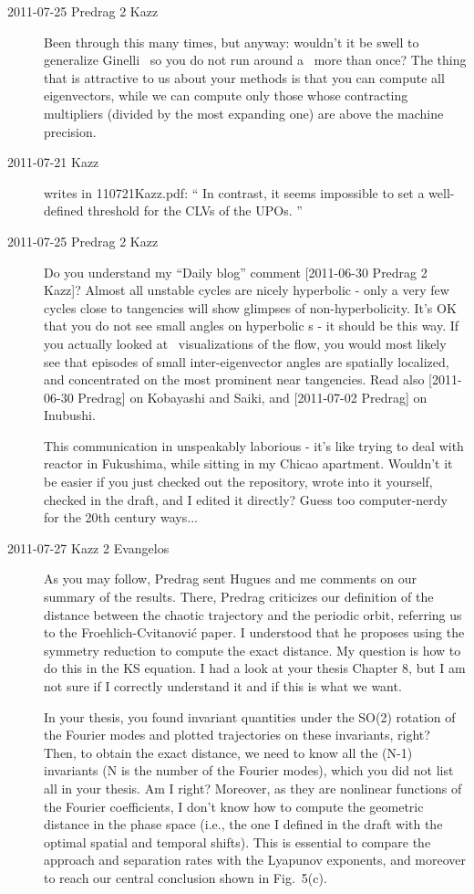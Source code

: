 \begin{description}
\item[2011-07-25 Predrag 2 Kazz]
Been through this many times, but anyway: wouldn't it be swell to
generalize Ginelli \etal\ so you do not run around a \po\ more than once?
The thing that is attractive to us about your methods is that you can
compute all eigenvectors, while we can compute only those whose
contracting multipliers (divided by the most expanding one) are above the
machine precision.

\item[2011-07-21 Kazz] writes in 110721Kazz.pdf:
``
In contrast, it seems impossible to set a well-defined threshold for the
CLVs of the UPOs.
''

\item[2011-07-25 Predrag 2 Kazz]
Do you understand my ``Daily blog'' comment  [2011-06-30 Predrag 2 Kazz]?
Almost all unstable cycles are nicely hyperbolic - only a very few cycles
close to tangencies will show glimpses of non-hyperbolicity. It's OK that
you do not see small angles on hyperbolic \po s - it should be this way.
If you actually looked at \statesp\ visualizations of the
flow, you would most likely see that
episodes of small inter-eigenvector angles are spatially localized, and
concentrated on the most prominent near tangencies. Read also [2011-06-30
Predrag] on Kobayashi and Saiki, and [2011-07-02 Predrag] on Inubushi.

This communication in unspeakably laborious - it's like trying to deal
with reactor in Fukushima, while sitting in my Chicao apartment. Wouldn't
it be easier if you just checked out the repository, wrote into it
yourself, checked in the draft, and I edited it directly? Guess too
computer-nerdy for the 20th century ways...

\item[2011-07-27 Kazz 2 Evangelos] As you may follow, Predrag sent Hugues
and me comments on our summary of the results. There, Predrag criticizes
our definition of the distance between the chaotic trajectory and the
periodic orbit, referring us to the Froehlich-Cvitanovi\'c paper. I
understood that he proposes using the symmetry reduction to compute the
exact distance. My question is how to do this in the KS equation. I had a
look at your thesis Chapter 8, but I am not sure if I correctly
understand it and if this is what we want.

In your thesis, you found invariant quantities under the SO(2) rotation
of the Fourier modes and plotted trajectories on these invariants, right?
Then, to obtain the exact distance, we need to know all the (N-1)
invariants (N is the number of the Fourier modes), which you did not list
all in your thesis. Am I right? Moreover, as they are nonlinear functions
of the Fourier coefficients, I don't know how to compute the geometric
distance in the phase space (i.e., the one I defined in the draft with
the optimal spatial and temporal shifts). This is essential to compare
the approach and separation rates with the Lyapunov exponents, and
moreover to reach our central conclusion shown in Fig.~5(c).


\end{description}
